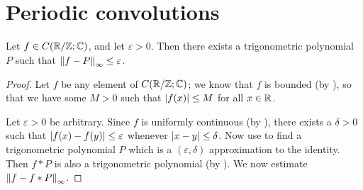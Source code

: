 \section{Periodic convolutions}\label{ii:sec:5.4}

\begin{thm}\label{ii:5.4.1}
  Let \(f \in C(\R / \Z ; \C)\), and let \(\varepsilon > 0\).
  Then there exists a trigonometric polynomial \(P\) such that \(\norm*{f - P}_{\infty} \leq \varepsilon\).
\end{thm}

\begin{proof}
  Let \(f\) be any element of \(C(\R / \Z ; \C)\);
  we know that \(f\) is bounded (by ), so that we have some \(M > 0\) such that \(\abs{f(x)} \leq M\) for all \(x \in \R\).

  Let \(\varepsilon > 0\) be arbitrary.
  Since \(f\) is uniformly continuous (by ), there exists a \(\delta > 0\) such that \(\abs{f(x) - f(y)} \leq \varepsilon\) whenever \(\abs{x - y} \leq \delta\).
  Now use  to find a trigonometric polynomial \(P\) which is a \((\varepsilon, \delta)\) approximation to the identity.
  Then \(f * P\) is also a trigonometric polynomial (by ).
  We now estimate \(\norm*{f - f * P}_{\infty}\).


\end{proof}
